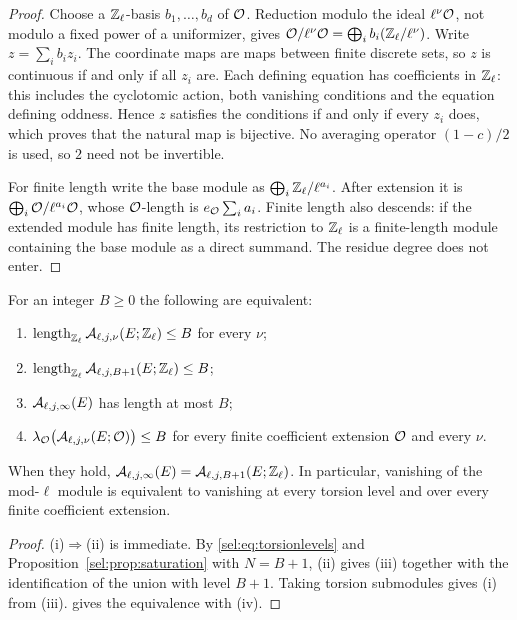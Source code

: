 \begin{proof}
Choose a $\mathbb{Z}_\ell$-basis $b_1,\dots,b_d$ of $\mathcal{O}$. Reduction modulo the
ideal $\ell^\nu\mathcal{O}$, not modulo a fixed power of a uniformizer, gives
$\mathcal{O}/\ell^\nu\mathcal{O}=\bigoplus_ib_i(\mathbb{Z}_\ell/\ell^\nu)$. Write
$z=\sum_ib_iz_i$. The coordinate maps are maps between finite discrete
sets, so $z$ is continuous if and only if all $z_i$ are. Each defining
equation has coefficients in $\mathbb{Z}_\ell$: this includes the cyclotomic
action, both vanishing conditions and the equation defining oddness. Hence
$z$ satisfies the conditions if and only if every $z_i$ does, which proves
that the natural map is bijective. No averaging operator $(1-c)/2$ is used,
so $2$ need not be invertible.

For finite length write the base module as
$\bigoplus_i\mathbb{Z}_\ell/\ell^{a_i}$. After extension it is
$\bigoplus_i\mathcal{O}/\ell^{a_i}\mathcal{O}$, whose $\mathcal{O}$-length is $e_{\mathcal{O}}\sum_ia_i$.
Finite length also descends: if the extended module has finite length, its
restriction to $\mathbb{Z}_\ell$ is a finite-length module containing the base
module as a direct summand. The residue degree does not enter.
\end{proof}

\begin{corollary}\label{sel:cor:oneprecision}
For an integer $B\ge0$ the following are equivalent:
\begin{enumerate}[label=\textup{(\roman*)}]
\item $\operatorname{length}_{\mathbb{Z}_\ell}\mathcal{A}_{\ell,j,\nu}(E;\mathbb{Z}_\ell)\le B$ for every
$\nu$;
\item $\operatorname{length}_{\mathbb{Z}_\ell}\mathcal{A}_{\ell,j,B+1}(E;\mathbb{Z}_\ell)\le B$;
\item $\mathcal{A}_{\ell,j,\infty}(E)$ has length at most $B$;
\item $\lambda_{\mathcal{O}}\bigl(\mathcal{A}_{\ell,j,\nu}(E;\mathcal{O})\bigr)\le B$ for every
finite coefficient extension $\mathcal{O}$ and every $\nu$.
\end{enumerate}
When they hold, $\mathcal{A}_{\ell,j,\infty}(E)=\mathcal{A}_{\ell,j,B+1}(E;\mathbb{Z}_\ell)$. In
particular, vanishing of the mod-$\ell$ module is equivalent to vanishing
at every torsion level and over every finite coefficient extension.
\end{corollary}

\begin{proof}
(i)$\Rightarrow$(ii) is immediate. By \eqref{sel:eq:torsionlevels} and
Proposition~\ref{sel:prop:saturation} with $N=B+1$, (ii) gives (iii) together with the
identification of the union with level $B+1$. Taking torsion submodules
gives (i) from (iii).  gives the equivalence with
(iv).
\end{proof}

